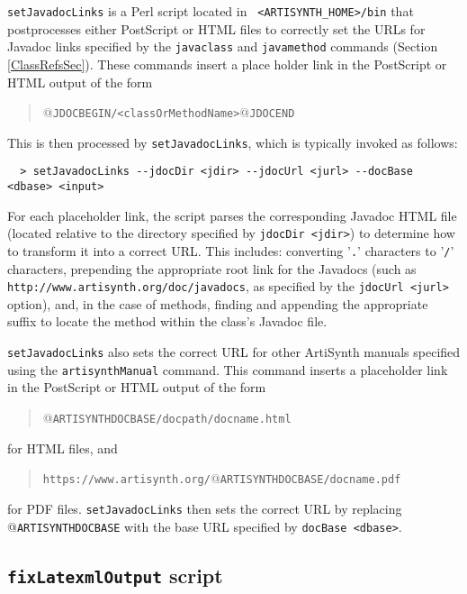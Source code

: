 \documentclass{article}
\begin{document}
{\tt setJavadocLinks} is a Perl script located in {\tt
<ARTISYNTH\_HOME>/bin} that postprocesses either PostScript or HTML
files to correctly set the URLs for Javadoc links specified by the
{\tt \BKS javaclass} and {\tt \BKS javamethod} commands (Section
\ref{ClassRefsSec}). These commands insert a place holder link in the
PostScript or HTML output of the form

\begin{quote}
@{\tt JDOCBEGIN/<classOrMethodName>}@{\tt JDOCEND}
\end{quote}

This is then processed by {\tt setJavadocLinks}, which is typically
invoked as follows:
%
\begin{verbatim}
  > setJavadocLinks --jdocDir <jdir> --jdocUrl <jurl> --docBase <dbase> <input>       
\end{verbatim}
%
For each placeholder link, the script parses the corresponding Javadoc
HTML file (located relative to the directory specified by 
{\tt \DHY jdocDir <jdir>}) to determine how to transform it into a correct
URL. This includes: converting '{\tt .}' characters to '{\tt /}'
characters, prepending the appropriate root link for the Javadocs
(such as \\ 
{\tt http://www.\-artisynth.org/doc/javadocs}, as specified
by the {\tt \DHY jdocUrl <jurl>} option), and, in the case of methods, finding and
appending the appropriate suffix to locate the method within the
class's Javadoc file.

{\tt setJavadocLinks} also sets the correct URL for other ArtiSynth
manuals specified using the {\tt \BKS artisynthManual} command.  This
command inserts a placeholder link in the PostScript or HTML output of the form

\begin{quote}
@{\tt ARTISYNTHDOCBASE/docpath/docname.html}
\end{quote}

for HTML files, and 

\begin{quote}
{\tt https://www.artisynth.org/}@{\tt ARTISYNTHDOCBASE/docname.pdf}
\end{quote}

for PDF files. {\tt setJavadocLinks} then sets the correct URL by replacing
@{\tt ARTISYNTHDOCBASE} with the base URL specified by
{\tt \DHY docBase <dbase>}.

\subsection{{\tt fixLatexmlOutput} script}
\label{fixLatexmlOutputSec}
\end{document}
